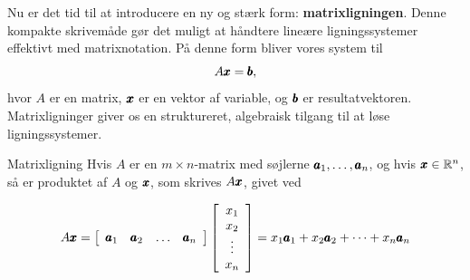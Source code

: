 Nu er det tid til at introducere en ny og stærk form: \textbf{matrixligningen}. Denne kompakte skrivemåde gør det muligt at håndtere lineære ligningssystemer effektivt med matrixnotation. På denne form bliver vores system til  
\[
A \pmb{x} = \pmb{b},
\]
hvor \(A\) er en matrix, \(\pmb{x}\) er en vektor af variable, og \(\pmb{b}\) er resultatvektoren. Matrixligninger giver os en struktureret, algebraisk tilgang til at løse ligningssystemer.

\begin{definition}{Matrixligning}
  Hvis $A$ er en $m \times n$-matrix med søjlerne $\pmb{a}_1, \ldots, \pmb{a}_n$, og hvis $\pmb{x} \in \mathbb{R}^n$, så er produktet af $A$ og $\pmb{x}$, som skrives $A \pmb{x}$, givet ved

\[
A \pmb{x} = \left[\begin{array}{llll}
\pmb{a}_1 & \pmb{a}_2 & \ldots & \pmb{a}_n
\end{array}\right] \left[\begin{array}{c}
x_1 \\
x_2 \\
\vdots \\
x_n
\end{array}\right] = x_1 \pmb{a}_1 + x_2 \pmb{a}_2 + \cdots + x_n \pmb{a}_n
\]
    
\end{definition}

